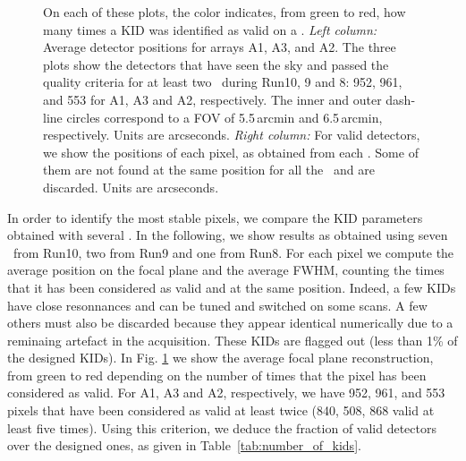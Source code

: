 \begin{figure}[p]
\begin{center}
\caption[KID selection and stability of position in the FOV]{On each of these
  plots, the color indicates, from green to red, how many times a KID was
  identified as valid on a \bm. \emph{Left column:} Average detector positions
  for arrays A1, A3, and A2. The three plots show the detectors that have seen
  the sky and passed the quality criteria for at least two \bms\ during Run10, 9
  and 8: 952, 961, and 553 for A1, A3 and A2, respectively. The inner and outer
  dash-line circles correspond to a FOV of 5.5\,arcmin and 6.5\,arcmin,
  respectively. Units are arcseconds. \emph{Right column:} For valid detectors,
  we show the positions of each pixel, as obtained from each \bm. Some of them
  are not found at the same position for all the \bms\ and are discarded. Units
  are arcseconds.}
\label{fig:avg_fov_color}
\end{center}
\end{figure}

In order to identify the most stable pixels, we compare the KID parameters
obtained with several \bms.  In the following, we show results as obtained using
seven \bms\ from Run10, two from Run9 and one from Run8.  For each pixel we
compute the average position on the focal plane and the average FWHM, counting
the times that it has been considered as valid and at the same position. Indeed,
a few KIDs have close resonnances and can be tuned and switched on some scans. A
few others must also be discarded because they appear identical numerically due
to a reminaing artefact in the acquisition. These KIDs are flagged out (less
than 1\% of the designed KIDs). In Fig. \ref{fig:avg_fov_color} we show the
average focal plane reconstruction, from green to red depending on the number of
times that the pixel has been considered as valid. For A1, A3 and A2,
respectively, we have 952, 961, and 553 pixels that have been considered as
valid at least twice (840, 508, 868 valid at least five times). Using this
criterion, we deduce the fraction of valid detectors over the designed ones, as
given in Table~\ref{tab:number_of_kids}.


